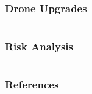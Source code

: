 \documentclass[aspectratio=169]{rubeamer}
\begin{document}
\begin{frame}
  \frametitle{Drone Upgrades}
  \begin{columns}
    \centering
  \end{columns}
\end{frame}

\begin{frame}
  \frametitle{Risk Analysis}
  \begin{columns}
    \centering
  \end{columns}
\end{frame}

\begin{frame}[allowframebreaks]
  \frametitle{References}
  \printbibliography{}
\end{frame}
\end{document}
